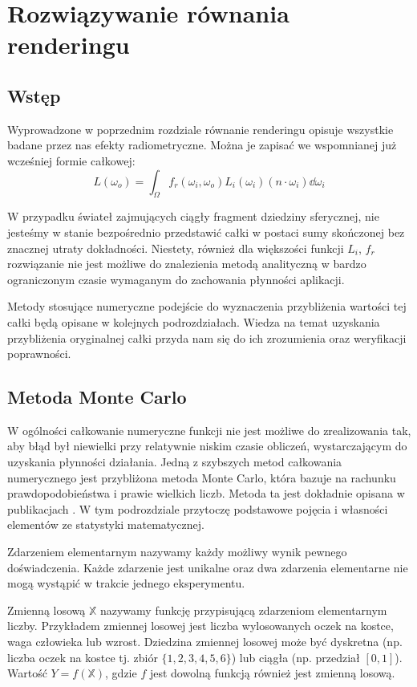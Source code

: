 \documentclass[../main.tex]{subfiles}
\begin{document}
\chapter{Rozwiązywanie równania renderingu}

\section{Wstęp}

Wyprowadzone w poprzednim rozdziale równanie renderingu opisuje wszystkie badane przez nas efekty radiometryczne. Można je zapisać we wspomnianej już wcześniej formie całkowej:
\[
  L(\omega_o) = \int_{\Omega} {
      f_r(\omega_i, \omega_o)
      L_i(\omega_i)
      (n \cdot \omega_i)
      \dd{\omega_i}
  }
\]

W przypadku świateł zajmujących ciągły fragment dziedziny sferycznej, nie jesteśmy w stanie bezpośrednio przedstawić całki w postaci sumy skończonej bez znacznej utraty dokładności. Niestety, również dla większości funkcji $L_i$, $f_r$ rozwiązanie nie jest możliwe do znalezienia metodą analityczną w bardzo ograniczonym czasie wymaganym do zachowania płynności aplikacji.

Metody stosujące numeryczne podejście do wyznaczenia przybliżenia wartości tej całki będą opisane w kolejnych podrozdziałach. Wiedza na temat uzyskania przybliżenia oryginalnej całki przyda nam się do ich zrozumienia oraz weryfikacji poprawności.

\section{Metoda Monte Carlo}

W ogólności całkowanie numeryczne funkcji nie jest możliwe do zrealizowania tak, aby błąd był niewielki przy relatywnie niskim czasie obliczeń, wystarczającym do uzyskania płynności działania. Jedną z szybszych metod całkowania numerycznego jest przybliżona metoda Monte Carlo, która bazuje na rachunku prawdopodobieństwa i prawie wielkich liczb. Metoda ta jest dokładnie opisana w publikacjach \cite{Sierocinski,MonteCarloAnderson,Veach}. W tym podrozdziale przytoczę podstawowe pojęcia i własności elementów ze statystyki matematycznej.

Zdarzeniem elementarnym nazywamy każdy możliwy wynik pewnego doświadczenia. Każde zdarzenie jest unikalne oraz dwa zdarzenia elementarne nie mogą wystąpić w trakcie jednego eksperymentu.

Zmienną losową $\mathbb{X}$ nazywamy funkcję przypisującą zdarzeniom elementarnym liczby. Przykładem zmiennej losowej jest liczba wylosowanych oczek na kostce, waga człowieka lub wzrost. Dziedzina zmiennej losowej może być dyskretna (np. liczba oczek na kostce tj. zbiór $\{1,2,3,4,5,6\}$) lub ciągła (np. przedział $[0,1]$). Wartość $Y = f(\mathbb{X})$, gdzie $f$ jest dowolną funkcją również jest zmienną losową. 
\end{document}
